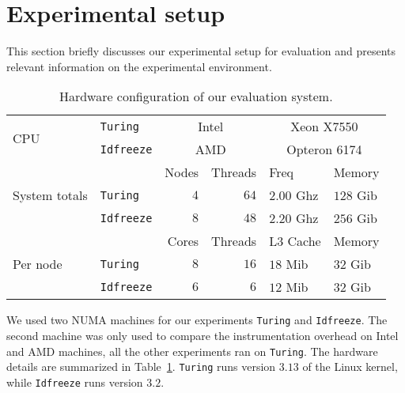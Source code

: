 
\section{Experimental setup}
\label{sec:metho}

This section briefly discusses our experimental setup for \TABARNAC evaluation
and presents relevant information on the experimental environment.

\begin{table}[htb]
    \centering
    \begin{tabular}{lp{1.1cm}rrp{1.35cm}p{1.1cm}}
        \toprule[.05em]
        \multirow{2}{.8cm}{CPU}& \texttt{Turing}  & \multicolumn{2}{c}{Intel} & \multicolumn{2}{c}{Xeon X7550} \\
        & \texttt{Idfreeze} & \multicolumn{2}{c}{AMD} & \multicolumn{2}{c}{Opteron 6174} \\
        \midrule[.02em]
        \midrule[.02em]
        \multirow{3}{.8cm}{System totals}
        & & Nodes & Threads & Freq & Memory \\
        \cmidrule[.01em](lr){3-6}
        & \texttt{Turing}   & $4$ & $64$ & $2.00$ Ghz & $128$ Gib \\
        & \texttt{Idfreeze} & $8$ & $48$ & $2.20$ Ghz & $256$ Gib\\
        \midrule[.02em]
        \midrule[.02em]
        \multirow{3}{.8cm}{Per node}
        & & Cores & Threads & L3 Cache & Memory \\
        \cmidrule[.01em](lr){3-6}
        & \texttt{Turing}   & $8$ & $16$ & $18$ Mib & $32$ Gib \\
        & \texttt{Idfreeze} & $6$ & $6$  & $12$ Mib & $32$ Gib \\
        \bottomrule[.05em]
    \end{tabular}
    \vspace{4pt}
    \caption{Hardware configuration of our evaluation system.}
    \label{tab:hw}
\end{table}

We used two NUMA machines for our experiments \texttt{Turing} and
\texttt{Idfreeze}. The second machine was only used to compare the
instrumentation overhead on Intel and AMD machines, all the other experiments
ran on \texttt{Turing}. The hardware details are
summarized in Table~\ref{tab:hw}. \texttt{Turing} runs version $3.13$ of the
Linux kernel, while \texttt{Idfreeze} runs version $3.2$.

